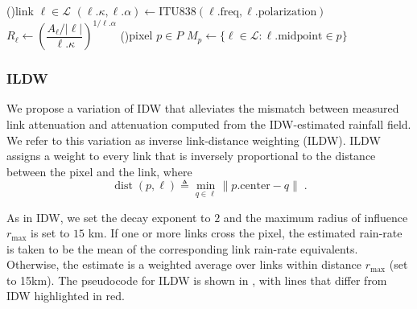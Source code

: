 \documentclass[a4paper,fleqn]{cas-sc}
\begin{document}
\begin{algorithm}[H]
  \caption{Discretized IDW. Each link is replaced with a virtual gauge located at the midpoint of the link. The rain-rate at the gauge is set to the rain-rate equivalent of its link. IDW is then applied with respect to these virtual gauges. We set the exponent of the decay to $2$. }
  \label{alg:idw}
  \DontPrintSemicolon
  \ForEach(){link $\ell \in \mathcal{L}$}{%
    $(\ell.\kappa,\ell.\alpha) \gets \mathrm{ITU838}(\ell.\mathrm{freq},\ell.\mathrm{polarization})$\;
    $R_\ell\gets \left(\dfrac{A_\ell/|\ell|}{\ell.\kappa}\right)^{1/\ell.\alpha}$\;
  }
  \ForEach(){pixel $p \in {P}$}{
    $M_p \gets \{\ell \in \mathcal{L} : \ell.\mathrm{midpoint} \in p\}$\;
  }
\end{algorithm}


\subsubsection{ILDW}
We propose a variation of IDW that alleviates the mismatch between measured link attenuation and attenuation computed from the IDW-estimated rainfall field.
We refer to this variation as inverse link-distance weighting (ILDW).
ILDW assigns a weight to every link that is inversely proportional to the distance between the pixel and the link, where
\[
  \operatorname{dist}(p,\ell) \triangleq \min_{q\in \ell} \|p.\textrm{center}-q\|\;.
\]

As in IDW, we set the decay exponent to $2$ and the maximum radius of influence $r_{\max}$ is set to $15$ \si{\kilo\meter}.
If one or more links cross the pixel, the estimated rain-rate is taken to be the mean of the corresponding link rain-rate equivalents. Otherwise, the estimate is a weighted average over links within distance $r_{\max}$ (set to 15km). The pseudocode for ILDW is shown in , with lines that differ from IDW highlighted in red.
\end{document}
